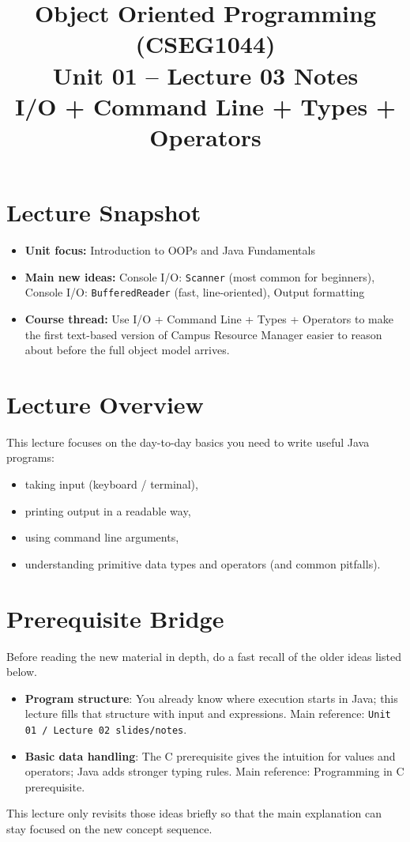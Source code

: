 \documentclass[11pt]{article}
\title{Object Oriented Programming (CSEG1044)\\Unit 01 -- Lecture 03 Notes\\I/O + Command Line + Types + Operators}
\begin{document}
\maketitle
\tableofcontents

\section{Lecture Snapshot}
\begin{itemize}
  \item \textbf{Unit focus:} Introduction to OOPs and Java Fundamentals
  \item \textbf{Main new ideas:} Console I/O: \texttt{Scanner} (most common for beginners), Console I/O: \texttt{BufferedReader} (fast, line-oriented), Output formatting
  \item \textbf{Course thread:} Use I/O + Command Line + Types + Operators to make the first text-based version of Campus Resource Manager easier to reason about before the full object model arrives.
\end{itemize}
\notesources{\OOPSUnitISources}

\section{Lecture Overview}
This lecture focuses on the day-to-day basics you need to write useful Java programs:
\begin{itemize}
  \item taking input (keyboard / terminal),
  \item printing output in a readable way,
  \item using command line arguments,
  \item understanding primitive data types and operators (and common pitfalls).
\end{itemize}
\notesources{\OOPSUnitISources}

\section{Prerequisite Bridge}
Before reading the new material in depth, do a fast recall of the older ideas listed below.
\begin{itemize}
  \item \textbf{Program structure}: You already know where execution starts in Java; this lecture fills that structure with input and expressions. Main reference: \texttt{Unit 01 / Lecture 02 slides/notes}.
  \item \textbf{Basic data handling}: The C prerequisite gives the intuition for values and operators; Java adds stronger typing rules. Main reference: Programming in C prerequisite.
\end{itemize}
This lecture only revisits those ideas briefly so that the main explanation can stay focused on the new concept sequence.
\notesources{\OOPSUnitISources}
\end{document}
